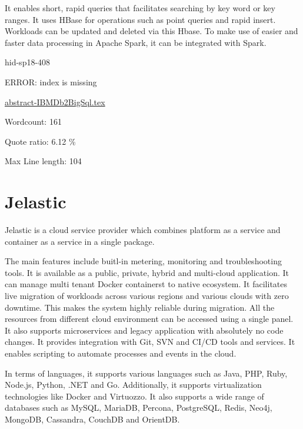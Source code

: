 It enables short, rapid queries that facilitates searching by key word or key 
ranges. It uses HBase for operations such as point queries and rapid insert.
Workloads can be updated and deleted via this Hbase. To make use of easier and
faster data processing in Apache Spark, it can be integrated with Spark\cite{hid-sp18-408-IBMDB2BigSql}.
 


\begin{IU}

hid-sp18-408

ERROR: index is missing

\href{https://github.com/cloudmesh-community/hid-sp18-408/blob/master//technology/abstract-IBMDb2BigSql.tex}{abstract-IBMDb2BigSql.tex}

 

Wordcount: 161


Quote ratio: 6.12 \%
 
Max Line length: 104
\end{IU}

\section{Jelastic}
Jelastic is a cloud service provider which combines
platform as a service and container as a service in a single
package. 

The main features include buitl-in metering, monitoring 
and troubleshooting tools. It is available as a public, private, 
hybrid and multi-cloud application. It can manage multi tenant 
Docker containerst to native ecosystem. It facilitates live migration
of workloads across various regions and various clouds with 
zero downtime. This makes the system highly reliable during 
migration. All the resources from different cloud environment
can be accessed using a single panel. It also supports 
microservices and legacy application with absolutely no code
changes. It provides integration with Git, SVN and CI/CD tools
and services. It enables scripting to automate processes and events
in the cloud.

In terms of languages, it supports various languages such as Java, PHP, Ruby,
Node.js, Python, .NET and Go. Additionally, it supports virtualization 
technologies like Docker and Virtuozzo. It also supports a wide
range of databases such as MySQL, MariaDB, Percona, PostgreSQL, 
Redis, Neo4j, MongoDB, Cassandra, CouchDB and OrientDB\cite{hid-sp18-408-JelasticWiki}.




